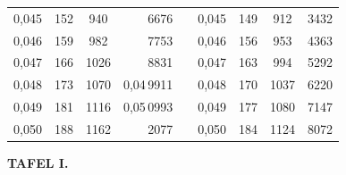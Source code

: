 \begin{tabular}{|c|c|c|r|@{}p{9pt}@{}|c|c|c|r|}
0,045 & 152 & 940 & 6676 &  & 0,045 & 149 & 912 & 3432 \\[3pt]
0,046 & 159 & 982 & 7753 &  & 0,046 & 156 & 953 & 4363 \\
0,047 & 166 & 1026 & 8831 &  & 0,047 & 163 & 994 & 5292 \\
0,048 & 173 & 1070 & 0,04\,9911 &  & 0,048 & 170 & 1037 & 6220 \\
0,049 & 181 & 1116 & 0,05\,0993 &  & 0,049 & 177 & 1080 & 7147 \\
0,050 & 188 & 1162 & 2077 &  & 0,050 & 184 & 1124 & 8072 \\
\hline
\end{tabular}\par
\endgroup
\clearpage
{}
\begingroup
\centering
\fontsize{9}{9}\selectfont
\setlength{\tabcolsep}{6pt}
\renewcommand{\arraystretch}{1}
\setlength{\parskip}{0pt}
\textbf{TAFEL I.}
\par\vspace{7pt}
